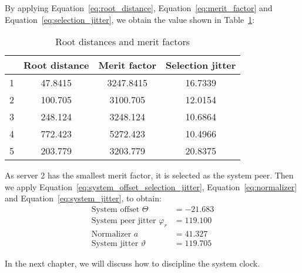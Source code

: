 By applying Equation~\ref{eq:root_distance}, Equation~\ref{eq:merit_factor}
and Equation~\ref{eq:selection_jitter},
we obtain the value shown in Table~\ref{tab:root_distance}:
\begin{table}[!h]
    \centering
    \caption{Root distances and merit factors}
    \label{tab:root_distance}
    \begin{tabular}{|c|c|c|c|}
        \hline
         & Root distance & Merit factor & Selection jitter \\
        \hline
         1 & 47.8415 & 3247.8415 & 16.7339 \\
         2 & 100.705 & 3100.705  & 12.0154 \\
         3 & 248.124 & 3248.124  & 10.6864 \\
         4 & 772.423 & 5272.423  & 10.4966 \\
         5 & 203.779 & 3203.779  & 20.8375 \\
        \hline
    \end{tabular}
\end{table}

As server 2 has the smallest merit factor, it is selected as the system peer.
Then we apply
Equation~\ref{eq:system_offset_selection_jitter}, Equation~\ref{eq:normalizer}
and Equation~\ref{eq:system_jitter}, to obtain:
\begin{align*}
    \text{System offset } \Theta & = -21.683\\ 
    \text{System peer jitter } \varphi_r &= 119.100\\
    \text{Normalizer } a &= 41.327\\
    \text{System jitter } \vartheta & = 119.705
\end{align*}

In the next chapter, we will discuss how to discipline the system clock.
